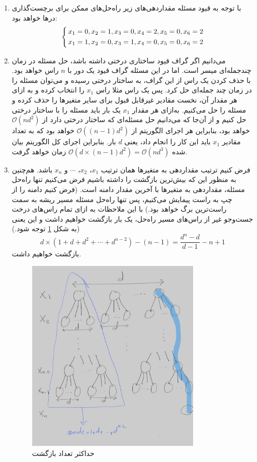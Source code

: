 \documentclass[a4paper, 12pt]{article}
\begin{document}
\begin{enumerate}[آ)]
	\item
	با توجه به قیود مسئله مقداردهی‌های زیر راه‌حل‌های ممکن برای برچست‌گذاری درها خواهد بود:
	\[
	\begin{dcases}
		\, x_1 = 0, x_2= 1, x_3= 0, x_4= 2, x_5= 0, x_6= 2\\ 
		\, x_1 = 1, x_2= 0, x_3= 1, x_4= 0, x_5= 0, x_6= 2
	\end{dcases}
	\]
	\item
	می‌دانیم اگر گراف قیود ساختاری درختی داشته باشد، حل مسئله در زمان چندجمله‌ای میسر است. اما در این مسئله گراف قیود یک دور با $n$ راس خواهد بود. با حذف کردن یک راس از این گراف، به ساختار درختی رسیده و می‌توان مسئله را در زمان چند جمله‌ای حل کرد. پس یک راس مثلا راس $x_1$ را انتخاب کرده و به ازای هر مقدار آن، نخست مقادیر غیرقابل قبول برای سایر متغیرها را حذف کرده و مسئله را حل می‌کنیم. به‌ازای هر مقدار $x_1$ یک بار باید مسئله را با ساختار درختی حل کنیم و از آن‌جا که می‌دانیم حل مسئله‌ای که ساختار درختی دارد از 
	$\mathcal{O}(nd^2)$
	خواهد بود، بنابراین هر اجرای الگوریتم از
	$\mathcal{O}((n-1)d^2)$
	خواهد بود که به تعداد مقادیر $x_1$ باید این کار را انجام داد، یعنی $d$ بار. بنابراین اجرای کل الگوریتم بیان شده 
	$\mathcal{O}(d\times(n-1)d^2) = \mathcal{O}(nd^3)$
	زمان خواهد گرفت.
	\item
	فرض کنیم ترتیب مقداردهی به متغیرها همان ترتیب
	$x_1$،
	$x_2$، $\cdots$
	و
	$x_n$
	باشد. هم‌چنین به منظور این که بیش‌ترین بازگشت را داشته باشیم فرض می‌کنیم تنها راه‌حل مسئله، مقداردهی به متغیرها با آخرین مقدار دامنه است. (فرض کنیم دامنه را از چپ به راست پیمایش می‌کنیم، پس تنها راه‌حل مسئله مسیر ریشه به سمت راست‌ترین برگ خواهد بود.) با این ملاحظات به ازای تمام راس‌های درخت جست‌وجو غیر از راس‌های مسیر راه‌حل، یک بار بازگشت خواهیم داشت و این یعنی (به شکل \ref{fig:backtrack} توجه شود.)
	$$d \times (1 + d + d^2 + \cdots + d^{n-2}) - (n-1) = \frac{d^n-d}{d-1}-n+1$$ 
	بازگشت خواهیم داشت.
	\begin{figure}[H]
		\centering
		\includegraphics[width=0.8\textwidth]{backtrack.jpg}
		\caption{حداکثر تعداد بازگشت}
		\label{fig:backtrack}
	\end{figure}
	\end{enumerate}
\end{document}
